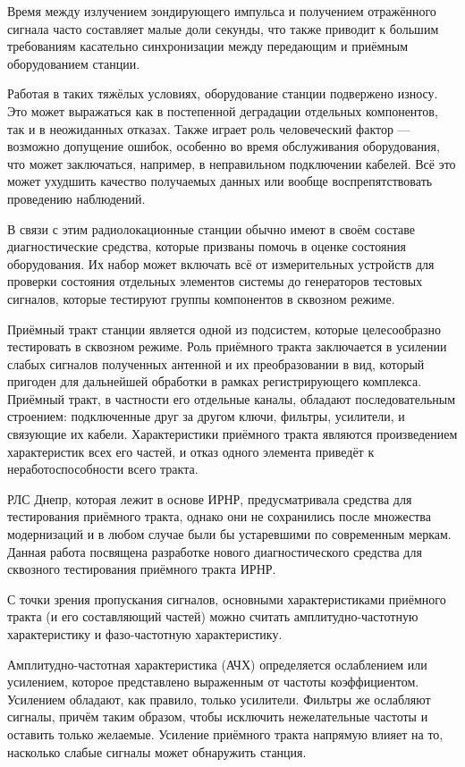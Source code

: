 \documentclass{report}
\begin{document}
Время между излучением зондирующего импульса и получением отражённого сигнала часто составляет малые доли секунды, что также приводит к большим требованиям касательно синхронизации между передающим и приёмным оборудованием станции.

Работая в таких тяжёлых условиях, оборудование станции подвержено износу. Это может выражаться как в постепенной деградации отдельных компонентов, так и в неожиданных отказах. Также играет роль человеческий фактор --- возможно допущение ошибок, особенно во время обслуживания оборудования, что может заключаться, например, в неправильном подключении кабелей. Всё это может ухудшить качество получаемых данных или вообще воспрепятствовать проведению наблюдений.

В связи с этим радиолокационные станции обычно имеют в своём составе диагностические средства, которые призваны помочь в оценке состояния оборудования. Их набор может включать всё от измерительных устройств для проверки состояния отдельных элементов системы до генераторов тестовых сигналов, которые тестируют группы компонентов в сквозном режиме.

Приёмный тракт станции является одной из подсистем, которые целесообразно тестировать в сквозном режиме. Роль приёмного тракта заключается в усилении слабых сигналов полученных антенной и их преобразовании в вид, который пригоден для дальнейшей обработки в рамках регистрирующего комплекса. Приёмный тракт, в частности его отдельные каналы, обладают последовательным строением: подключенные друг за другом ключи, фильтры, усилители, и связующие их кабели. Характеристики приёмного тракта являются произведением характеристик всех его частей, и отказ одного элемента приведёт к неработоспособности всего тракта.

РЛС Днепр, которая лежит в основе ИРНР, предусматривала средства для тестирования приёмного тракта, однако они не сохранились после множества модернизаций и в любом случае были бы устаревшими по современным меркам. Данная работа посвящена разработке нового диагностического средства для сквозного тестирования приёмного тракта ИРНР.

С точки зрения пропускания сигналов, основными характеристиками  приёмного тракта (и его составляющий частей) можно считать амплитудно-частотную характеристику и фазо-частотную характеристику.

Амплитудно-частотная характеристика (АЧХ) определяется ослаблением или усилением, которое представлено выраженным от частоты коэффициентом. Усилением обладают, как правило, только усилители. Фильтры же ослабляют сигналы, причём таким образом, чтобы исключить нежелательные частоты и оставить только желаемые. Усиление приёмного тракта напрямую влияет на то, насколько слабые сигналы может обнаружить станция.
\end{document}

